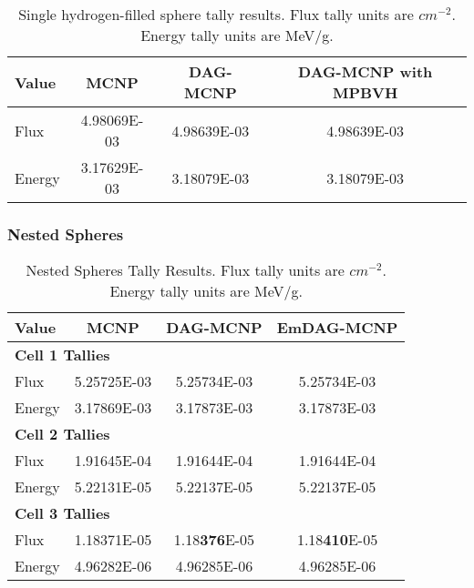   \begin{table}[H]
    \small
    \begin{center}
      \begin{tabular}{lccc}
        \toprule
        Value & MCNP & DAG-MCNP & DAG-MCNP with MPBVH \\
        \toprule
        \hline
        Flux   & 4.98069E-03 & 4.98639E-03 & 4.98639E-03 \\
        Energy & 3.17629E-03 & 3.18079E-03 & 3.18079E-03 \\
        \bottomrule
      \end{tabular}
      \caption[Single hydrogen-filled sphere tally results.]{Single
        hydrogen-filled sphere tally results. Flux tally units are
        $cm^{-2}$. Energy tally units are MeV/g.}
      \label{nestedspheres}
    \end{center}
  \end{table}

  \subsubsection{Nested Spheres}

  \begin{table}[H]
    \small
    \begin{center}
      \begin{tabular}{lccc}
        \toprule
        Value & MCNP & DAG-MCNP & EmDAG-MCNP \\
        \toprule
        \multicolumn{4}{l}{\textbf{Cell 1 Tallies}} \\
        \hline
        Flux    & 5.25725E-03 & 5.25734E-03 & 5.25734E-03 \\
        Energy  & 3.17869E-03 &  3.17873E-03 &  3.17873E-03 \\
        \hline
        \multicolumn{4}{l}{\textbf{Cell 2 Tallies}} \\
        \hline
        Flux    & 1.91645E-04 & 1.91644E-04 & 1.91644E-04 \\
        Energy  & 5.22131E-05 & 5.22137E-05 & 5.22137E-05 \\
        \hline
        \multicolumn{4}{l}{\textbf{Cell 3 Tallies}} \\
        \hline
        Flux    & 1.18371E-05 & 1.18\textbf{376}E-05 & 1.18\textbf{410}E-05 \\
        Energy  & 4.96282E-06 & 4.96285E-06 & 4.96285E-06 \\
        \bottomrule
        
      \end{tabular}
      \caption[Nested Spheres Tally Results.]{Nested Spheres Tally Results. Flux
        tally units are $cm^{-2}$. Energy tally units are MeV/g.}
      \label{nestedspheres}
    \end{center}
  \end{table}

